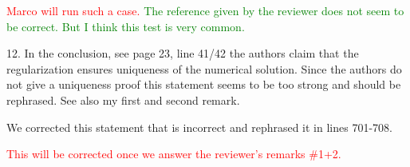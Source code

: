\documentclass{article}
\newcommand{\tcr}[1]{\textcolor{red}{#1}}
\newcommand{\tcg}[1]{\textcolor{green}{#1}}
\begin{document}
\tcr{Marco will run such a case.} \tcg{The reference given by the reviewer does not seem to be correct. But I think
this test is very common.}
\bigskip


{\color{blue}
12. In the conclusion, see page 23, line 41/42 the authors claim that the regularization
ensures uniqueness of the numerical solution. Since the authors do not give a 
uniqueness proof this statement seems to be too strong and should be rephrased. See also
my first and second remark.}

We corrected this statement that is incorrect and rephrased it in lines 701-708.

\tcr{This will be corrected once we answer the reviewer's remarks \#1+2.}
\bigskip
\end{document}
